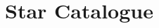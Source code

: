 \documentclass[../../main.tex]{subfiles}
\begin{document}
\section{Star Catalogue}
\label{appendix:star_catalogue}
\thispagestyle{fancy}

\blindtext %
\end{document}
